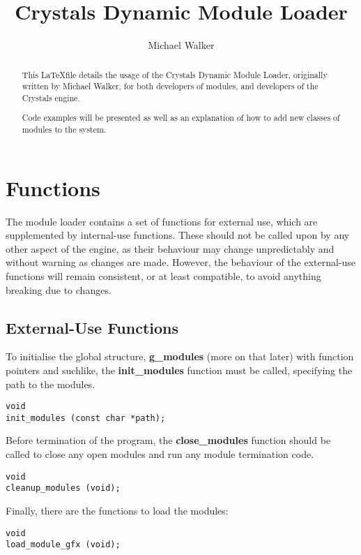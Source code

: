 \documentclass[12pt,a4paper]{article}
\author{Michael Walker}
\title{Crystals Dynamic Module Loader}
\date{}
\begin{document}
\maketitle{}

\begin{abstract}
This \LaTeX file details the usage of the Crystals Dynamic Module Loader, originally written by Michael Walker, for both developers of modules, and developers of the Crystals engine.

Code examples will be presented as well as an explanation of how to add new classes of modules to the system.
\end{abstract}

\section{Functions}

The module loader contains a set of functions for external use, which are supplemented by internal-use functions. These should not be called upon by any other aspect of the engine, as their behaviour may change unpredictably and without warning as changes are made. However, the behaviour of the external-use functions will remain consistent, or at least compatible, to avoid anything breaking due to changes.

\subsection{External-Use Functions}

To initialise the global structure, \textbf{g\_modules} (more on that later) with function pointers and suchlike, the \textbf{init\_modules} function must be called, specifying the path to the modules.

\begin{lstlisting}
void
init_modules (const char *path);
\end{lstlisting}

Before termination of the program, the \textbf{close\_modules} function should be called to close any open modules and run any module termination code.

\begin{lstlisting}
void
cleanup_modules (void);
\end{lstlisting}

Finally, there are the functions to load the modules:

\begin{lstlisting}
void
load_module_gfx (void);
\end{lstlisting}
\end{document}
